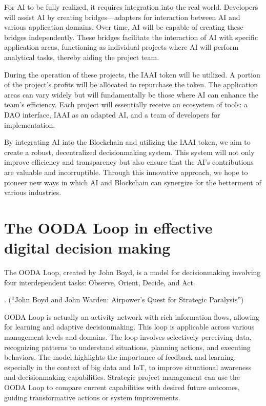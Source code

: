 \documentclass[a4paper,12pt,english]{sphinxmanual}
\begin{document}
\sphinxAtStartPar
For AI to be fully realized, it requires integration into the real
world. Developers will assist AI by creating bridges—adapters for
interaction between AI and various application domains. Over time, AI
will be capable of creating these bridges independently. These bridges
facilitate the interaction of AI with specific application areas,
functioning as individual projects where AI will perform analytical
tasks, thereby aiding the project team.

\sphinxAtStartPar
During the operation of these projects, the IAAI token will be utilized.
A portion of the project’s profits will be allocated to repurchase the
token. The application areas can vary widely but will fundamentally be
those where AI can enhance the team’s efficiency. Each project will
essentially receive an ecosystem of tools: a DAO interface, IAAI as an
adapted AI, and a team of developers for implementation.

\sphinxAtStartPar
By integrating AI into the Blockchain and utilizing the IAAI token, we
aim to create a robust, decentralized decision\sphinxhyphen{}making system. This
system will not only improve efficiency and transparency but also ensure
that the AI’s contributions are valuable and incorruptible. Through this
innovative approach, we hope to pioneer new ways in which AI and
Blockchain can synergize for the betterment of various industries.


\chapter{The OODA Loop in effective digital decision making}
\label{\detokenize{index:the-ooda-loop-in-effective-digital-decision-making}}
\sphinxAtStartPar
The OODA Loop, created by John Boyd, is a model for decision\sphinxhyphen{}making
involving four interdependent tasks: Observe, Orient, Decide, and Act.

\sphinxAtStartPar
{}

\sphinxAtStartPar
{}. (“John Boyd and John Warden:
Airpower’s Quest for Strategic Paralysis”)

\sphinxAtStartPar
OODA Loop is actually an activity network with rich information flows,
allowing for learning and adaptive decision\sphinxhyphen{}making. This loop is
applicable across various management levels and domains. The loop
involves selectively perceiving data, recognizing patterns to understand
situations, planning actions, and executing behaviors. The model
highlights the importance of feedback and learning, especially in the
context of big data and IoT, to improve situational awareness and
decision\sphinxhyphen{}making capabilities. Strategic project management can use the
OODA Loop to compare current capabilities with desired future outcomes,
guiding transformative actions or system improvements.
\end{document}
